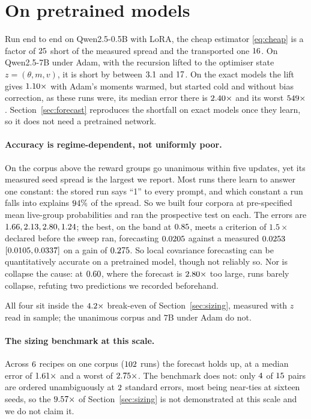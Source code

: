 \section{On pretrained models}
\label{sec:real}

Run end to end on Qwen2.5-0.5B with LoRA, the cheap estimator \eqref{eq:cheap} is a factor of
$25$ short of the measured spread and the transported one $16$. On Qwen2.5-7B under Adam,
with the recursion lifted to the optimiser state $z = (\theta, m, v)$, it is short by between
$3.1$ and $17$. On the exact models the lift gives
$1.10\times$ with Adam's moments warmed, but started cold and without bias
correction, as these runs were, its median error there is $2.40\times$ and
its worst $549\times$. Section~\ref{sec:forecast} reproduces the shortfall on exact
models once they learn, so it does not need a pretrained network.

\paragraph{Accuracy is regime-dependent, not uniformly poor.} On the corpus above the reward
groups go unanimous within five updates, yet its measured seed spread is the largest we report.
Most runs there learn to answer one constant: the stored run says ``1'' to every prompt, and
which constant a run falls into explains $94\%$ of the spread. So we built four corpora at
pre-specified mean live-group probabilities and ran the prospective test on each. The errors are
$1.66, 2.13, 2.80, 1.24$; the best, on the band at $0.85$, meets a criterion of $1.5\times$
declared before the sweep ran, forecasting $0.0205$ against a measured
$0.0253$ $[0.0105, 0.0337]$ on a gain of $0.275$. So
local covariance forecasting can be quantitatively accurate on a pretrained model, though not
reliably so. Nor is collapse the cause: at $0.60$, where the forecast is
$2.80\times$ too large, runs barely collapse, refuting two predictions we recorded beforehand.

All four sit inside the $4.2\times$ break-even of Section~\ref{sec:sizing},
measured with $z$ read in sample; the unanimous corpus and $7$B under Adam do not.

\paragraph{The sizing benchmark at this scale.} Across $6$ recipes on one
corpus ($102$ runs) the forecast holds up, at a median error of
$1.61\times$ and a worst of $2.75\times$. The benchmark does not:
only $4$ of $15$ pairs are ordered unambiguously at
$2$ standard errors, most being near-ties at sixteen seeds, so the
$9.57\times$ of Section~\ref{sec:sizing} is not demonstrated at this scale and we do
not claim it.

